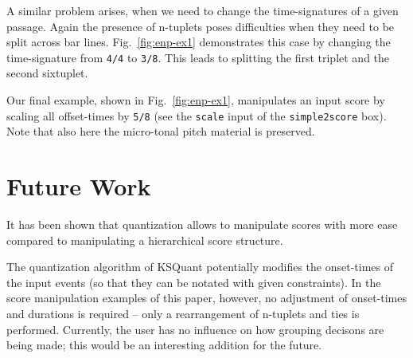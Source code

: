 \documentclass[runningheads,a4paper]{llncs}
\begin{document}
A similar problem arises, when we need to change the time-signatures
of a given passage. Again the presence of n-tuplets poses difficulties
when they need to be split across bar lines. Fig.~\ref{fig:enp-ex1}
demonstrates this case by changing the time-signature from
\texttt{4/4} to \texttt{3/8}. This leads to splitting the first
triplet and the second sixtuplet.




Our final example, shown in Fig.~\ref{fig:enp-ex1}, manipulates an input score by
scaling all offset-times by \texttt{5/8} (see the \texttt{scale} input of the
\texttt{simple2score} box). Note that also here the micro-tonal pitch
material is preserved.


\section{Future Work}
It has been shown that quantization allows to manipulate scores with
more ease compared to manipulating a hierarchical score structure.

The quantization algorithm of KSQuant potentially modifies the
onset-times of the input events (so that they can be notated with
given constraints). In the score manipulation examples of this paper,
however, no adjustment of onset-times and durations is required --
only a rearrangement of n-tuplets and ties is performed. Currently,
the user has no influence on how grouping decisons are being made;
this would be an interesting addition for the future.
\end{document}

